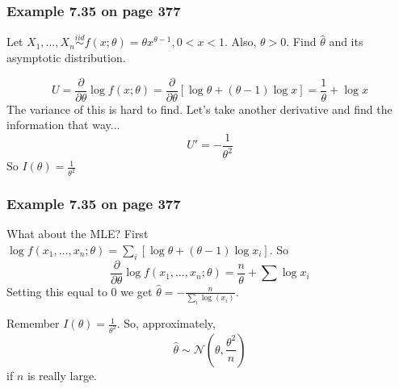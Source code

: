 \documentclass{beamer}
\begin{document}
\begin{frame}
\frametitle{Example 7.35 on page 377}

Let $X_1, \ldots, X_n \overset{iid}{\sim} f(x;\theta) = \theta x^{\theta-1 }, 0 < x < 1$. Also, $\theta > 0$. Find $\hat{\theta}$ and its asymptotic distribution.
\newline
\pause

\[
U = \frac{\partial}{\partial \theta} \log f(x;\theta) = \frac{\partial}{\partial \theta}[ \log \theta + (\theta-1)\log x] = \frac{1}{\theta} + \log x
\]
The variance of this is hard to find. Let's take another derivative and find the information that way...
\[
U' = -\frac{1}{\theta^2}
\]
So $I(\theta) = \frac{1}{\theta^2}$
\end{frame}

\begin{frame}
\frametitle{Example 7.35 on page 377}

What about the MLE? First $ \log f(x_1, \ldots, x_n ; \theta) = \sum_i  [\log \theta + (\theta-1)\log x_i]$. So
\[
\frac{\partial}{\partial \theta} \log f(x_1, \ldots, x_n ; \theta) = \frac{n}{\theta} + \sum \log x_i
\]
Setting this equal to $0$ we get $\hat{\theta} = -\frac{n}{\sum_i \log(x_i)}$.
\newline

Remember $I(\theta) = \frac{1}{\theta^2}$. So, approximately,
\[
\hat{\theta} \sim \mathcal{N}(\theta, \frac{\theta^2}{n}) 
\]
if $n$ is really large.
\end{frame}
\end{document}
